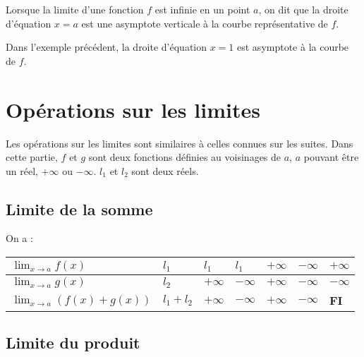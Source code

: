 \documentclass[11pt,fleqn, openany]{book} %
\begin{document}
\begin{definition}Lorsque la limite d'une fonction $f$ est infinie en un point $a$, on dit que la droite d'équation $x=a$ est une asymptote verticale à la courbe représentative de $f$.\end{definition}

\begin{example} Dans l'exemple précédent, la droite d'équation $x=1$ est asymptote à la courbe de $f$.\end{example}


\section{Opérations sur les limites}

Les opérations sur les limites sont similaires à celles connues sur les suites. Dans cette partie, $f$ et $g$ sont deux fonctions définies au voisinages de $a$, $a$ pouvant être un réel, $+\infty$ ou $-\infty$. $l_1$ et $l_2$ sont deux réels.

\subsection{Limite de la somme}

\begin{proposition} On a :

\begin{center}
\begin{tabularx}{\linewidth}{|l|X|X|X|X|X|X|}
\hline
$\displaystyle \lim_{x \to a} f(x)$ & $l_1$ & $l_1$ & $l_1$ & $+\infty$ & $-\infty$ & $ +\infty$\\
\hline
$\displaystyle \lim_{x \to a} g(x)$ & $l_2$ & $+\infty$ & $-\infty$ & $+\infty$ & $-\infty$ & $-\infty$ \\
\hline
$\displaystyle \lim_{x \to a} (f(x)+g(x))$ & $l_1+l_2$ & $+\infty$ & $-\infty$ & $+\infty$ & $-\infty$  & \textbf{FI}\\
\hline
\end{tabularx}
\end{center}\end{proposition}

\newpage


\subsection{Limite du produit}
\end{document}
